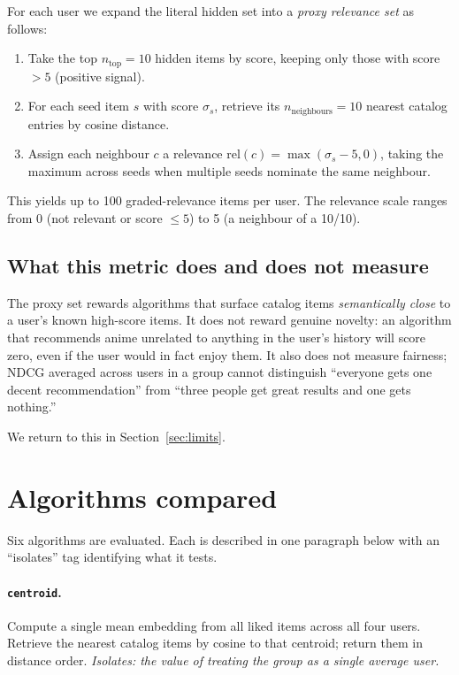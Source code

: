 \documentclass[11pt]{article}
\begin{document}
For each user we expand the literal hidden set into a \emph{proxy
relevance set} as follows:
\begin{enumerate}[leftmargin=*]
\item Take the top $n_{\mathrm{top}} = 10$ hidden items by score, keeping
only those with score $> 5$ (positive signal).
\item For each seed item $s$ with score $\sigma_s$, retrieve its
$n_{\mathrm{neighbours}} = 10$ nearest catalog entries by cosine
distance.
\item Assign each neighbour $c$ a relevance
$\mathrm{rel}(c) = \max(\sigma_s - 5, 0)$, taking the maximum across
seeds when multiple seeds nominate the same neighbour.
\end{enumerate}
This yields up to 100 graded-relevance items per user. The relevance
scale ranges from 0 (not relevant or score $\leq 5$) to 5 (a
neighbour of a 10/10).

\subsection{What this metric does and does not measure}

The proxy set rewards algorithms that surface catalog items
\emph{semantically close} to a user's known high-score items. It does
not reward genuine novelty: an algorithm that recommends anime
unrelated to anything in the user's history will score zero, even if
the user would in fact enjoy them. It also does not measure fairness;
NDCG averaged across users in a group cannot distinguish ``everyone
gets one decent recommendation'' from ``three people get great results
and one gets nothing.''

We return to this in Section~\ref{sec:limits}.

\section{Algorithms compared}
\label{sec:algos}

Six algorithms are evaluated. Each is described in one paragraph below
with an ``isolates'' tag identifying what it tests.

\paragraph{\texttt{centroid}.}
Compute a single mean embedding from all liked items across all four
users. Retrieve the nearest catalog items by cosine to that centroid;
return them in distance order. \emph{Isolates: the value of treating the
group as a single average user.}
\end{document}
